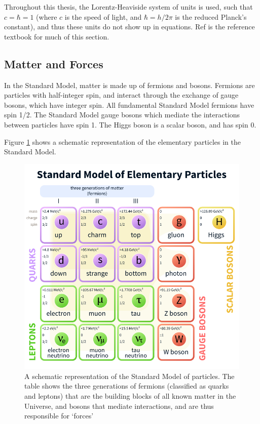\documentclass[11pt,a4paper,openright,twoside]{report}
\begin{document}
Throughout this thesis, the Lorentz-Heaviside system of units is used, such that $c=\hbar=1$ (where $c$ is the speed of light, and $\hbar=h/2\pi$ is the reduced Planck's constant), and thus these units do not show up in equations. Ref \cite{griff} is the reference textbook for much of this section.

\subsection{Matter and Forces}

In the Standard Model, matter is made up of fermions and bosons. Fermions are particles with half-integer spin, and interact through the exchange of gauge bosons, which have integer spin. All fundamental Standard Model fermions have spin 1/2. The Standard Model gauge bosons which mediate the interactions between particles have spin 1. The Higgs boson is a scalar boson, and has spin 0.

Figure \ref{fig:SM} shows a schematic representation of the elementary particles in the Standard Model.

\begin{figure}[H]
\centering
\includegraphics[width=0.8\linewidth]{standard_model.png}
\caption{A schematic representation of the Standard Model\cite{SM} of particles. The table shows the three generations of fermions (classified as quarks and leptons) that are the building blocks of all known matter in the Universe, and bosons that mediate interactions, and are thus responsible for `forces'}
\label{fig:SM}
\end{figure}
\end{document}
